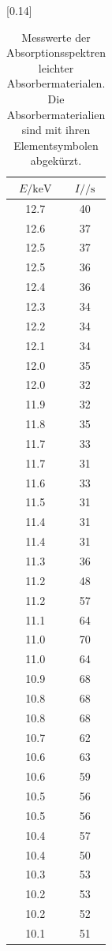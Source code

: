 \begin{table}[h! p]
  \centering
  \caption{Messwerte der Absorptionsspektren leichter Absorbermaterialen. Die Absorbermaterialien
  sind mit ihren Elementsymbolen abgekürzt.}
  \label{tab:11}
  [0.14\textwidth]{
  \begin{tabular}{c c|}
    \toprule
    $E / \si{\kilo\electronvolt}$ & $I / \si{\per\second}$ \\
    \midrule
    12.7 & 40 \\
    12.6 & 37 \\
    12.5 & 37 \\
    12.5 & 36 \\
    12.4 & 36 \\
    12.3 & 34 \\
    12.2 & 34 \\
    12.1 & 34 \\
    12.0 & 35 \\
    12.0 & 32 \\
    11.9 & 32 \\
    11.8 & 35 \\
    11.7 & 33 \\
    11.7 & 31 \\
    11.6 & 33 \\
    11.5 & 31 \\
    11.4 & 31 \\
    11.4 & 31 \\
    11.3 & 36 \\
    11.2 & 48 \\
    11.2 & 57 \\
    11.1 & 64 \\
    11.0 & 70 \\
    11.0 & 64 \\
    10.9 & 68 \\
    10.8 & 68 \\
    10.8 & 68 \\
    10.7 & 62 \\
    10.6 & 63 \\
    10.6 & 59 \\
    10.5 & 56 \\
    10.5 & 56 \\
    10.4 & 57 \\
    10.4 & 50 \\
    10.3 & 53 \\
    10.2 & 53 \\
    10.2 & 52 \\
    10.1 & 51 \\

\end{tabular}}
\end{table}
